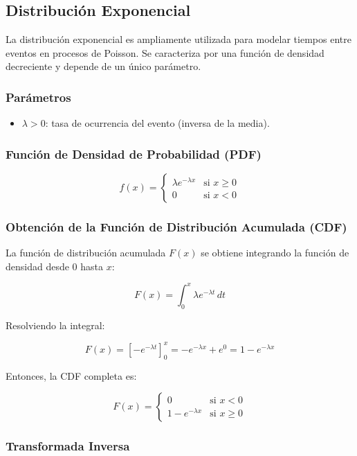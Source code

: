 \documentclass{article}
\begin{document}
\subsection{Distribución Exponencial}

La distribución exponencial es ampliamente utilizada para modelar tiempos entre eventos en procesos de Poisson. Se caracteriza por una función de densidad decreciente y depende de un único parámetro.

\subsubsection*{Parámetros}

\begin{itemize}
  \item $\lambda > 0$: tasa de ocurrencia del evento (inversa de la media).
\end{itemize}

\subsubsection*{Función de Densidad de Probabilidad (PDF)}

\[
f(x) =
\begin{cases}
\lambda e^{-\lambda x} & \text{si } x \geq 0 \\
0 & \text{si } x < 0
\end{cases}
\]

\subsubsection*{Obtención de la Función de Distribución Acumulada (CDF)}

La función de distribución acumulada $F(x)$ se obtiene integrando la función de densidad desde 0 hasta $x$:

\[
F(x) = \int_0^x \lambda e^{-\lambda t} \, dt
\]

Resolviendo la integral:

\[
F(x) = \left[ -e^{-\lambda t} \right]_0^x = -e^{-\lambda x} + e^0 = 1 - e^{-\lambda x}
\]

Entonces, la CDF completa es:

\[
F(x) =
\begin{cases}
0 & \text{si } x < 0 \\
1 - e^{-\lambda x} & \text{si } x \geq 0
\end{cases}
\]



\subsubsection{Transformada Inversa}
\end{document}
